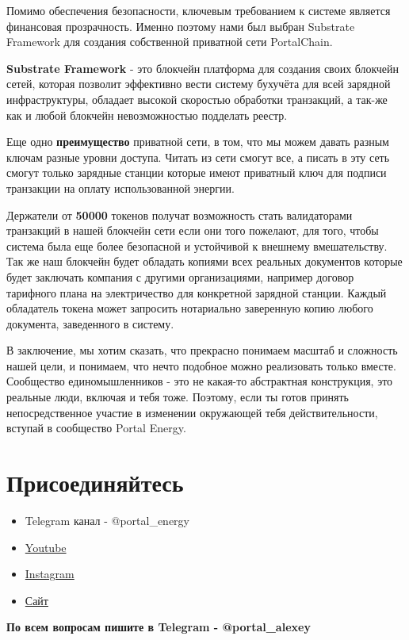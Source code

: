 \documentclass[a4paper,12pt]{report}
\begin{document}
Помимо обеспечения безопасности, ключевым требованием к системе является финансовая прозрачность.
Именно поэтому нами был выбран Substrate Framework для создания собственной приватной сети PortalChain.

\textbf{Substrate Framework} - это блокчейн платформа для создания своих блокчейн сетей, которая позволит эффективно вести систему бухучёта для всей зарядной инфраструктуры, обладает высокой скоростью обработки транзакций, а так-же как и любой блокчейн невозможностью подделать реестр.

Еще одно \textbf{преимущество} приватной сети, в том, что мы можем давать разным ключам разные уровни доступа. Читать из сети смогут все, а писать в эту сеть смогут только зарядные станции которые имеют приватный ключ для подписи транзакции на оплату использованной энергии.

Держатели от \textbf{50000} токенов получат возможность стать валидаторами транзакций в нашей блокчейн сети если они того пожелают, для того, чтобы система была еще более безопасной и устойчивой к внешнему вмешательству. Так же наш блокчейн будет обладать копиями всех реальных документов которые будет заключать компания с другими организациями, например договор тарифного плана на электричество для конкретной зарядной станции.
Каждый обладатель токена может запросить нотариально заверенную копию любого документа, заведенного в систему.

В заключение, мы хотим сказать, что прекрасно понимаем масштаб и сложность нашей цели, и понимаем, что нечто подобное можно реализовать только вместе. Сообщество единомышленников - это не какая-то абстрактная конструкция, это реальные люди, включая и тебя тоже. Поэтому, если ты готов принять непосредственное участие в изменении окружающей тебя действительности, вступай в сообщество Portal Energy.

\section{Присоединяйтесь}

\begin{itemize}
	\item Telegram канал - @portal\_energy
	\item \href{https://www.youtube.com/channel/UCtPxyCkz73i78F9HChlO61w}{Youtube}
	\item \href{https://www.instagram.com/petr_roadrunner/}{Instagram}
	\item \href{https://portalenergy.tech}{Сайт}
\end{itemize}

\textbf{По всем вопросам пишите в Telegram - @portal\_alexey}
\end{document}
